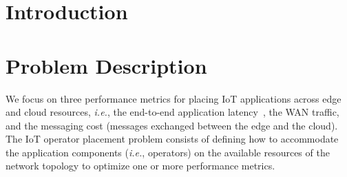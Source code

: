 \section{Introduction}
\section{Problem Description}
We focus on three performance metrics for placing \ac{IoT} applications across edge and cloud resources, \textit{i.e.}, the end-to-end application latency~\cite{daSilvaVeith:2018}, the WAN traffic, and the messaging cost (messages exchanged between the edge and the cloud). The \ac{IoT} operator placement problem consists of defining how to accommodate the application components (\textit{i.e.}, operators) on the available resources of the network topology to optimize one or more performance metrics. 

